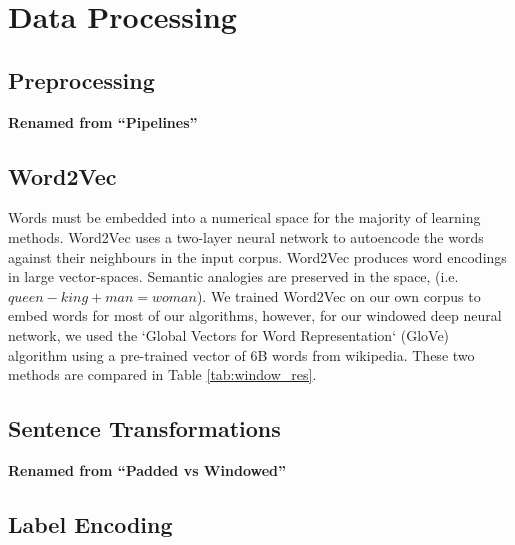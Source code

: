 \section{Data Processing}
\label{sec:data_processing}

  \subsection{Preprocessing}
  \label{sec:preprocessing}
    \textbf{Renamed from ``Pipelines''}

  \subsection{Word2Vec}
  \label{sec:word2vec}
  Words must be embedded into a numerical space for the majority of learning methods. Word2Vec uses a two-layer neural network to autoencode the words against their neighbours in the input corpus. Word2Vec produces word encodings in large vector-spaces. Semantic analogies are preserved in the space, (i.e. $queen - king + man = woman$). We trained Word2Vec on our own corpus to embed words for most of our algorithms, however, for our windowed deep neural network, we used the `Global Vectors for Word Representation` (GloVe) algorithm using a pre-trained vector of 6B words from wikipedia. These two methods are compared in Table \ref{tab:window_res}.

  \subsection{Sentence Transformations}
  \label{sec:sentence_transformations}
    \textbf{Renamed from ``Padded vs Windowed''}

  \subsection{Label Encoding}
  \label{sec:label_encoding}
